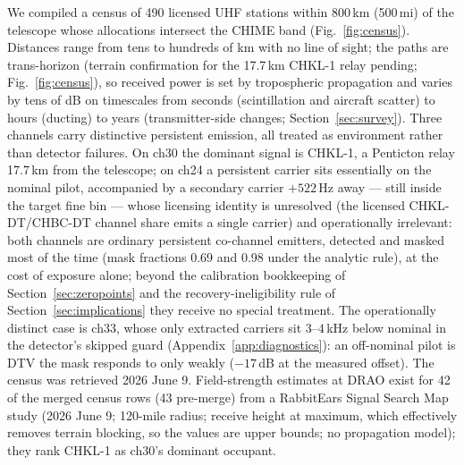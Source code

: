 We compiled a census of 490 licensed UHF stations within 800\,km
(500\,mi) of the telescope whose allocations intersect the CHIME band
(Fig.~\ref{fig:census}). Distances range from tens to hundreds of km with no
line of sight; the paths are trans-horizon (terrain confirmation for the
17.7\,km CHKL-1 relay pending; Fig.~\ref{fig:census}), so received power
is set by
tropospheric propagation and varies by tens of dB on timescales from seconds
(scintillation and aircraft scatter) to hours (ducting) to years
(transmitter-side changes; Section~\ref{sec:survey}). Three channels carry
distinctive persistent emission, all treated as environment rather than
detector failures. On ch30 the dominant signal is CHKL-1, a Penticton
relay 17.7\,km from the telescope; on ch24 a persistent carrier sits
essentially on the nominal pilot, accompanied by a secondary carrier
$+522$\,Hz away --- still inside the target fine bin --- whose
licensing identity is unresolved (the licensed CHKL-DT/CHBC-DT channel
share emits a single carrier) and operationally irrelevant: both
channels are ordinary persistent co-channel emitters, detected and
masked most of the time (mask fractions 0.69 and 0.98 under the
analytic rule), at the cost of exposure alone; beyond the calibration
bookkeeping of Section~\ref{sec:zeropoints} and the
recovery-ineligibility rule of Section~\ref{sec:implications} they
receive no special treatment. The operationally distinct case is ch33,
whose only extracted carriers sit $3$--$4$\,kHz below nominal in the
detector's skipped guard (Appendix~\ref{app:diagnostics}): an
off-nominal pilot is DTV the mask responds to only weakly
($-17$\,dB at the measured offset). The census was
retrieved 2026 June 9. Field-strength estimates at DRAO exist for 42 of
the merged census rows (43 pre-merge) from a RabbitEars Signal Search
Map study (2026 June 9; 120-mile radius; receive height at maximum,
which effectively removes terrain blocking, so the values are upper
bounds; no propagation model); they rank CHKL-1 as ch30's dominant
occupant. 

